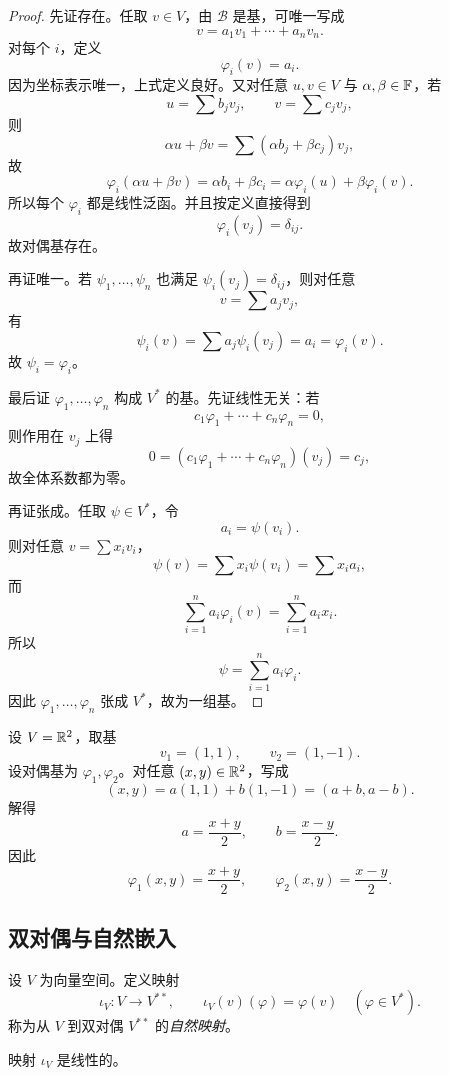 \begin{proof}
先证存在。任取 $v\in V$，由 $\mathcal B$ 是基，可唯一写成
\[
  v=a_1v_1+\cdots+a_nv_n.
\]
对每个 $i$，定义
\[
  \varphi_i(v)=a_i.
\]
因为坐标表示唯一，上式定义良好。又对任意 $u,v\in V$ 与 $\alpha,\beta\in\mathbb{F}$，若
\[
  u=\sum b_jv_j,\qquad v=\sum c_jv_j,
\]
则
\[
  \alpha u+\beta v=\sum (\alpha b_j+\beta c_j)v_j,
\]
故
\[
  \varphi_i(\alpha u+\beta v)=\alpha b_i+\beta c_i
  =\alpha\varphi_i(u)+\beta\varphi_i(v).
\]
所以每个 $\varphi_i$ 都是线性泛函。并且按定义直接得到
\[
  \varphi_i(v_j)=\delta_{ij}.
\]
故对偶基存在。

再证唯一。若 $\psi_1,\dots,\psi_n$ 也满足 $\psi_i(v_j)=\delta_{ij}$，则对任意
\[
  v=\sum a_jv_j,
\]
有
\[
  \psi_i(v)=\sum a_j\psi_i(v_j)=a_i=\varphi_i(v).
\]
故 $\psi_i=\varphi_i$。

最后证 $\varphi_1,\dots,\varphi_n$ 构成 $V^*$ 的基。先证线性无关：若
\[
  c_1\varphi_1+\cdots+c_n\varphi_n=0,
\]
则作用在 $v_j$ 上得
\[
  0=(c_1\varphi_1+\cdots+c_n\varphi_n)(v_j)=c_j,
\]
故全体系数都为零。

再证张成。任取 $\psi\in V^*$，令
\[
  a_i=\psi(v_i).
\]
则对任意 $v=\sum x_iv_i$，
\[
  \psi(v)=\sum x_i\psi(v_i)=\sum x_i a_i,
\]
而
\[
  \sum_{i=1}^n a_i\varphi_i(v)=\sum_{i=1}^n a_i x_i.
\]
所以
\[
  \psi=\sum_{i=1}^n a_i\varphi_i.
\]
因此 $\varphi_1,\dots,\varphi_n$ 张成 $V^*$，故为一组基。
\end{proof}

\begin{example}
设 $V=\mathbb{R}^2$，取基
\[
  v_1=(1,1),\qquad v_2=(1,-1).
\]
设对偶基为 $\varphi_1,\varphi_2$。对任意 $(x,y)\in\mathbb{R}^2$，写成
\[
  (x,y)=a(1,1)+b(1,-1)= (a+b, a-b).
\]
解得
\[
  a=\frac{x+y}{2},\qquad b=\frac{x-y}{2}.
\]
因此
\[
  \varphi_1(x,y)=\frac{x+y}{2},
  \qquad
  \varphi_2(x,y)=\frac{x-y}{2}.
\]
\end{example}

\subsection{双对偶与自然嵌入}

\begin{definition}
设 $V$ 为向量空间。定义映射
\[
  \iota_V\colon V\to V^{**},
  \qquad
  \iota_V(v)(\varphi)=\varphi(v)
  \quad (\varphi\in V^*) .
\]
称为从 $V$ 到双对偶 $V^{**}$ 的\emph{自然映射}。
\end{definition}

\begin{proposition}
映射 $\iota_V$ 是线性的。
\end{proposition}

